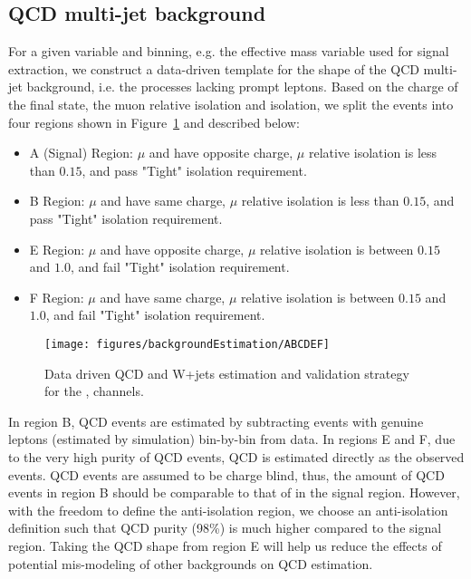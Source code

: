 \subsection{QCD multi-jet background}\label{sec:mtau_qcd}
For a given variable and binning, e.g. the effective mass variable
used for signal extraction, we construct a data-driven template for
the shape of the QCD multi-jet background, i.e. the processes lacking
prompt leptons.  Based on the charge of the final state, the muon 
relative isolation and \tauh isolation, we split the events into 
four regions shown in Figure~\ref{fig:ABCDEF} and described below:
\begin{itemize}
  \item A (Signal) Region: $\mu$ and \tauh have opposite charge, $\mu$ relative isolation is less than $0.15$, and \tauh pass "Tight" isolation requirement.
  \item B Region: $\mu$ and \tauh have same charge, $\mu$ relative isolation is less than $0.15$, and \tauh pass "Tight" isolation requirement.
  \item E Region: $\mu$ and \tauh have opposite charge, $\mu$ relative isolation is between $0.15$ and $1.0$, and \tauh fail "Tight" isolation requirement.
  \item F Region: $\mu$ and \tauh have same charge, $\mu$ relative isolation is between $0.15$ and $1.0$, and \tauh fail "Tight" isolation requirement.
\end{itemize}

\begin{figure}\centering
  \texttt{[image: figures/backgroundEstimation/ABCDEF]}
  \caption{\label{fig:ABCDEF} Data driven QCD and W+jets estimation and validation strategy for the \teth, \tmth channels.}
\end{figure}
In region B, QCD events are estimated by subtracting events
with genuine leptons (estimated by simulation) bin-by-bin from data. In regions E and F, 
due to the very high purity of QCD events, QCD is estimated directly as the observed 
events. QCD events are assumed to be charge blind, thus, the amount of QCD events 
in region B should be comparable to that of in the signal region. However, with the 
freedom to define the anti-isolation region, we choose an anti-isolation definition 
such that QCD purity (98\%) is much higher compared to the signal region. 
Taking the QCD shape from region E will help us reduce the effects of potential 
mis-modeling of other backgrounds on QCD estimation.

